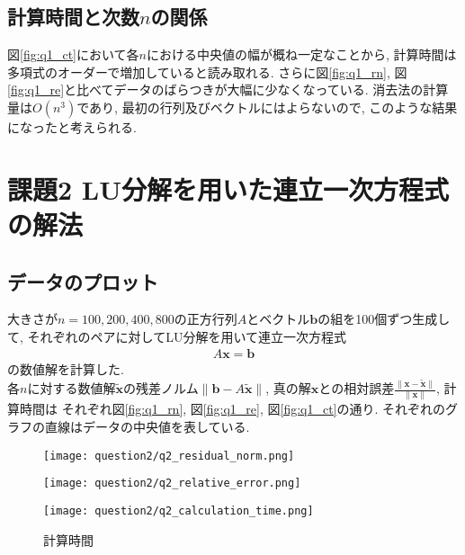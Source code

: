 \documentclass[uplatex,a4j]{jsarticle}
\begin{document}
\subsection{計算時間と次数$n$の関係}
\label{sec:q1_3}
図\ref{fig:q1_ct}において各$n$における中央値の幅が概ね一定なことから, 
計算時間は多項式のオーダーで増加していると読み取れる. 
さらに図\ref{fig:q1_rn}, 図\ref{fig:q1_re}と比べてデータのばらつきが大幅に少なくなっている.
消去法の計算量は$O(n^3)$であり, 最初の行列及びベクトルにはよらないので, このような結果になったと考えられる.


\section{課題2 LU分解を用いた連立一次方程式の解法}
\label{sec:q2}

\subsection{データのプロット}
\label{sec:q2_1}

大きさが$n = 100,200,400,800$の正方行列$A$とベクトル$\bm{b}$の組を100個ずつ生成して, 
それぞれのペアに対してLU分解を用いて連立一次方程式
\begin{align}
  A \bm{x} = \bm{b}
\end{align}
の数値解を計算した. \\
各$n$に対する数値解$\bm{\tilde{x}}$の残差ノルム$\| \bm{b} - A \bm{\tilde{x}} \|$, 
真の解$\bm{x}$との相対誤差$\frac{\| \bm{x} - \bm{\tilde{x}} \|}{\| \bm{x} \|}$, 計算時間は
それぞれ図\ref{fig:q1_rn}, 図\ref{fig:q1_re}, 図\ref{fig:q1_ct}の通り. 
それぞれのグラフの直線はデータの中央値を表している.

\begin{figure}[htbp]
  \centering

  \begin{minipage}[t]{0.48\textwidth}
    \centering
    \texttt{[image: question2/q2\_residual\_norm.png]}
    \label{fig:q2_rn}
  \end{minipage}
  \hfill
  \begin{minipage}[t]{0.48\textwidth}
    \centering
    \texttt{[image: question2/q2\_relative\_error.png]}
    \label{fig:q2_re}
  \end{minipage}
  
\end{figure}

\begin{figure}[ht]
  \centering
  \texttt{[image: question2/q2\_calculation\_time.png]}
  \caption{計算時間}
  \label{fig:q2_ct}
\end{figure}
\end{document}
